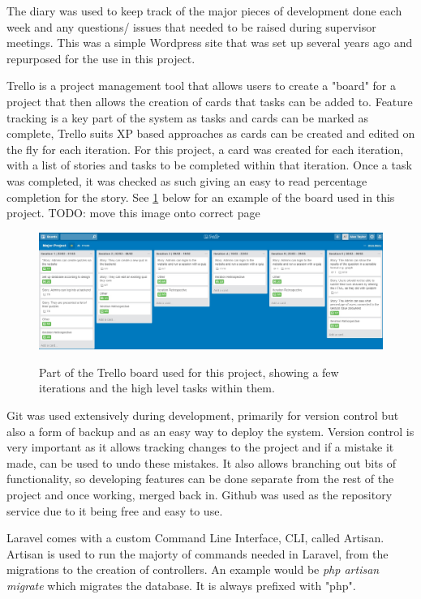 The diary was used to keep track of the major pieces of development done each week and any questions/ issues that needed to be raised during supervisor meetings. This was a simple Wordpress site that was set up several years ago and repurposed for the use in this project.

Trello is a project management tool that allows users to create a "board" for a project that then allows the creation of cards that tasks can be added to\cite{trello}. Feature tracking is a key part of the system as tasks and cards can be marked as complete, Trello suits XP based approaches as cards can be created and edited on the fly for each iteration. For this project, a card was created for each iteration, with a list of stories and tasks to be completed within that iteration. Once a task was completed, it was checked as such giving an easy to read percentage completion for the story. See \ref{fig:trello-board} below for an example of the board used in this project. TODO: move this image onto correct page

\begin{figure}
	\caption{Part of the Trello board used for this project, showing a few iterations and the high level tasks within them.}
	\includegraphics[width=\textwidth]{Chapter2/trello-board}
	\label{fig:trello-board}
\end{figure}
\newpage

Git was used extensively during development, primarily for version control but also a form of backup and as an easy way to deploy the system. Version control is very important as it allows tracking changes to the project and if a mistake it made, can be used to undo these mistakes. It also allows branching out bits of functionality, so developing features can be done separate from the rest of the project and once working, merged back in. Github was used as the repository service due to it being free and easy to use\cite{github}.

Laravel comes with a custom Command Line Interface, CLI, called Artisan\cite{artisan}. Artisan is used to run the majorty of commands needed in Laravel, from the migrations to the creation of controllers. An example would be \textit{php artisan migrate} which migrates the database. It is always prefixed with "php".

